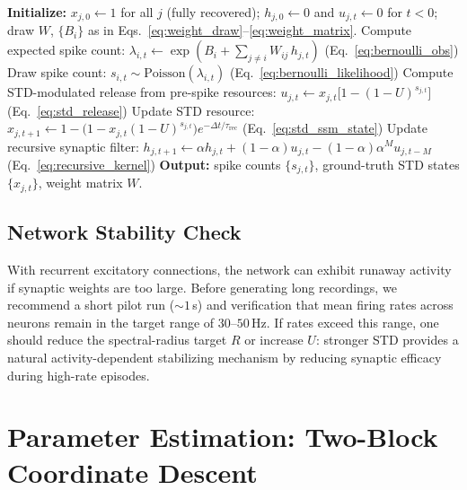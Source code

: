 \documentclass[11pt]{article}
\begin{document}
\begin{algorithm}
\caption{Synthetic network spike train generator}
\label{alg:generator}
\begin{algorithmic}[1]
\STATE \textbf{Initialize:} $x_{j,0} \leftarrow 1$ for all $j$ (fully recovered);
       $h_{j,0} \leftarrow 0$ and $u_{j,t}\leftarrow0$ for $t<0$; draw $W$, $\{B_i\}$ as in
       Eqs.~\eqref{eq:weight_draw}--\eqref{eq:weight_matrix}.
    \STATE Compute expected spike count:
           $\lambda_{i,t} \leftarrow \exp\!\left(B_i +
           \sum_{j \neq i} W_{ij}\,h_{j,t}\right)$
           \hfill(Eq.~\ref{eq:bernoulli_obs})
    \STATE Draw spike count:
           $s_{i,t} \sim \mathrm{Poisson}(\lambda_{i,t})$
           \hfill(Eq.~\ref{eq:bernoulli_likelihood})
  \ENDFOR
    \STATE Compute STD-modulated release from pre-spike resources:
           $u_{j,t} \leftarrow x_{j,t}\bigl[1-(1-U)^{s_{j,t}}\bigr]$
           \hfill(Eq.~\ref{eq:std_release})
    \STATE Update STD resource:
           $x_{j,t+1} \leftarrow
           1-\big(1-x_{j,t}(1-U)^{s_{j,t}}\big)e^{-\Delta t/\tau_{\mathrm{rec}}}$
           \hfill(Eq.~\ref{eq:std_ssm_state})
    \STATE Update recursive synaptic filter:
           $h_{j,t+1} \leftarrow
           \alpha h_{j,t} + (1-\alpha)u_{j,t}
           -(1-\alpha)\alpha^M u_{j,t-M}$
           \hfill(Eq.~\ref{eq:recursive_kernel})
  \ENDFOR
\ENDFOR
\STATE \textbf{Output:} spike counts $\{s_{j,t}\}$, ground-truth STD states
       $\{x_{j,t}\}$, weight matrix $W$.
\end{algorithmic}
\end{algorithm}

\subsection{Network Stability Check}
\label{sec:gen_stability}

With recurrent excitatory connections, the network can exhibit runaway activity
if synaptic weights are too large. Before generating long recordings, we recommend
a short pilot run ($\sim 1$\,s) and verification that mean firing rates across
neurons remain in the target range of $30$--$50$\,Hz. If rates exceed this
range, one should reduce the spectral-radius target $R$ or increase $U$: stronger
STD provides a natural activity-dependent stabilizing mechanism by reducing
synaptic efficacy during high-rate episodes.

\section{Parameter Estimation: Two-Block Coordinate Descent}
\label{sec:param_estimation}
\end{document}
